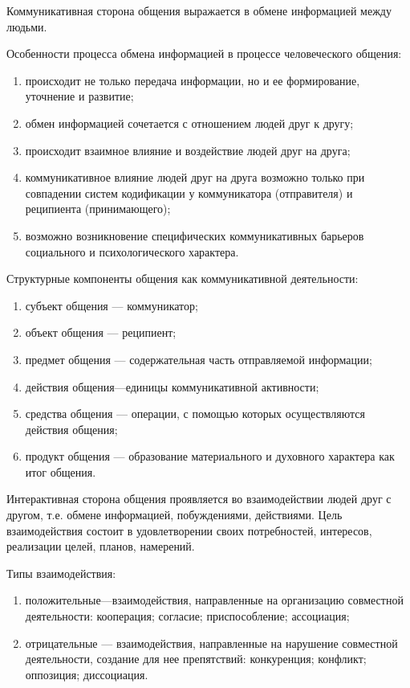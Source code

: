 Коммуникативная сторона общения выражается в обмене информацией между людьми. 

Особенности процесса обмена информацией в процессе человеческого общения:
\begin{enumerate}
	\item происходит не только передача информации, но и ее формирование, уточнение и развитие;
	\item обмен информацией сочетается с отношением людей друг к другу;
	\item происходит взаимное влияние и воздействие людей друг на друга;
	\item  коммуникативное влияние людей друг на друга возможно только при совпадении систем кодификации у коммуникатора (отправителя) и реципиента (принимающего);
	\item возможно возникновение специфических коммуникативных барьеров социального и психологического характера.
\end{enumerate}

Структурные компоненты общения как коммуникативной деятельности:
\begin{enumerate}
	\item субъект общения — коммуникатор;
	\item объект общения — реципиент;
	\item предмет общения — содержательная часть отправляемой информации;
	\item действия общения—единицы коммуникативной активности;
	\item средства общения — операции, с помощью которых осуществляются действия общения;
	\item продукт общения — образование материального и духовного характера как итог общения.
\end{enumerate}

Интерактивная сторона общения проявляется во взаимодействии людей друг с другом, т.е. обмене информацией, побуждениями, действиями. Цель взаимодействия состоит в удовлетворении своих потребностей, интересов, реализации целей, планов, намерений.

Типы взаимодействия:
\begin{enumerate}
	\item положительные—взаимодействия, направленные на организацию совместной деятельности: кооперация; согласие; приспособление; ассоциация; 
	\item отрицательные — взаимодействия, направленные на нарушение совместной деятельности, создание для нее препятствий: конкуренция; конфликт; оппозиция; диссоциация.
\end{enumerate}

